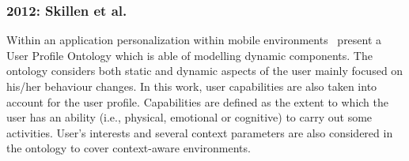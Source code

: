 
\subsubsection{2012: Skillen et al.}
\label{sec:skillen}

Within an application personalization within mobile 
environments~\citet{skillen2012ontological} present a User Profile Ontology 
which is able of modelling dynamic components. The ontology considers both 
static and dynamic aspects of the user mainly focused on his/her behaviour 
changes. In this work, user capabilities are also taken into account for the 
user profile. Capabilities are defined as the extent to which the user has an 
ability (i.e., physical, emotional or cognitive) to carry out some activities. 
User's interests and several context parameters are also considered in the 
ontology to cover context-aware environments.